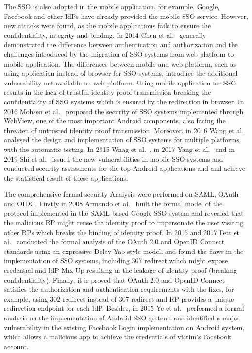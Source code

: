 
The SSO is also adopted in the mobile application, for example, Google, Facebook and other IdPs have already provided the mobile SSO service. However, new attacks were found, as the mobile applications fails to ensure the confidentiality, integrity and binding. In 2014 Chen et al.~\cite{ChenPCTKT14} generally demonstrated the difference between authentication and authorization and the challenges introduced by the migration of SSO systems from web platform to mobile application. The differences between mobile and web platform, such as using application instead of browser for SSO systems, introduce the additional vulnerability not available on web platform. Using mobile application for SSO results in the lack of trustful identity proof transmission breaking the confidentiality of SSO systems which is ensured by the redirection in browser. In 2016 Mohsen et al.~\cite{MohsenS16} proposed the security of SSO systems implemented through WebView, one of the most important Android components, also facing the threaten of untrusted identity proof transmission.
 Moreover, in 2016 Wang et al.~\cite{WangZLG16} analysed the design and implementation of SSO systems for multiple platforms with the automatic testing. In 2015 Wnag et al.~\cite{WangZLLYLG15}, in 2017 Yang et al.~\cite{YangLS17} and in 2019 Shi et al.~\cite{ShiWL19} issued the new vulnerabilities in mobile SSO systems and conducted security assessments for the top Android applications and and achieve the statistical result of these applications.




The comprehensive formal security Analysis were performed on SAML, OAuth and OIDC. Firstly in 2008 Armando et al.~\cite{ArmandoCCCT08} built the formal model of the protocol implemented in the SAML-based Google SSO system and revealed that the malicious RP might reuse the identity proof to impersonate the user visiting other RPs which breaks the binding of identity proof. In 2016 and 2017 Fett et al.~\cite{FettKS16, FettKS17} conducted the formal analysis of the OAuth 2.0 and OpenID Connect standards using an expressive Dolev-Yao style model, and found the flaws in the implementation of SSO systems, including 307 redirect wihch might expose credential and IdP Mix-Up resulting in the leakage of identity proof (breaking confidentiality). Finally, it is proved that OAuth 2.0 and OpenID Connect satisfies the authorization and authentication requirements with the fixes, for example, using 302 redirect instead of 307 redirect and RP provides a unique redirection endpoint for each IdP. Besides, in 2015 Ye et al.~\cite{YeBWD15} performed a formal analysis on the implementation of Android SSO systems and identified a major vulnerability in the existing Facebook Login implementation on Android system, which allows a malicious app to achieve the credentials of victim’s Facebook account.

